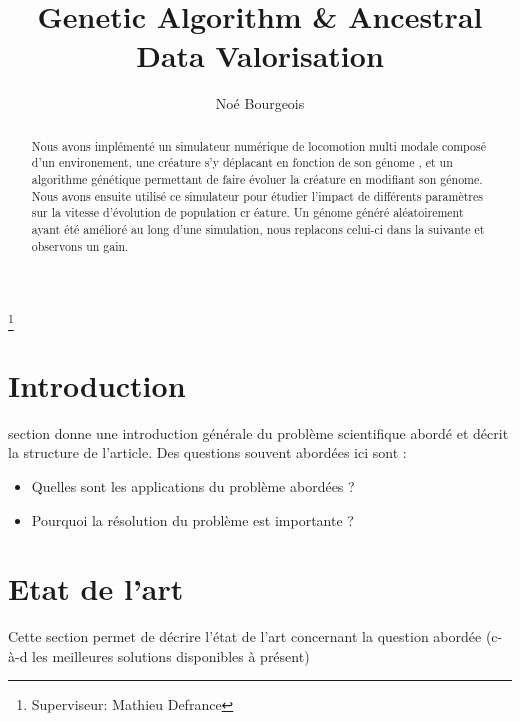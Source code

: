 \documentclass[journal, a4paper]{IEEEtran}
\begin{document}
	\title{Genetic Algorithm \& Ancestral Data Valorisation}
	\author{Noé Bourgeois}
	\thanks{Superviseur: Mathieu Defrance}
	\maketitle

\begin{abstract}
	Nous avons implémenté un simulateur numérique de locomotion multi
	modale
	composé d'un environement, une créature s'y déplacant en fonction
	de son génome
	, et
	un
	algorithme génétique permettant de faire évoluer la créature en
	modifiant son génome.
	Nous avons ensuite utilisé ce simulateur pour étudier l'impact de
	différents paramètres sur la vitesse d'évolution de population cr
	éature.
	Un génome généré aléatoirement ayant été amélioré au long d'une
	simulation, nous replacons celui-ci dans la suivante et observons
	un gain.

\end{abstract}

\section{Introduction}\label{sec:introduction}

	 section donne une introduction générale du problème scientifique abordé et décrit la structure de l'article.
	Des questions souvent abordées ici sont :
	\begin{itemize}
	\item Quelles sont les applications du problème abordées ?
	\item Pourquoi la résolution du problème est importante ?
	\end{itemize}	  

\section{Etat de l'art}\label{sec:etat-de-l'art}
	Cette section permet de décrire l'état de l'art
	concernant la question abordée
	(c-à-d les meilleures solutions disponibles à présent)
\end{document}
